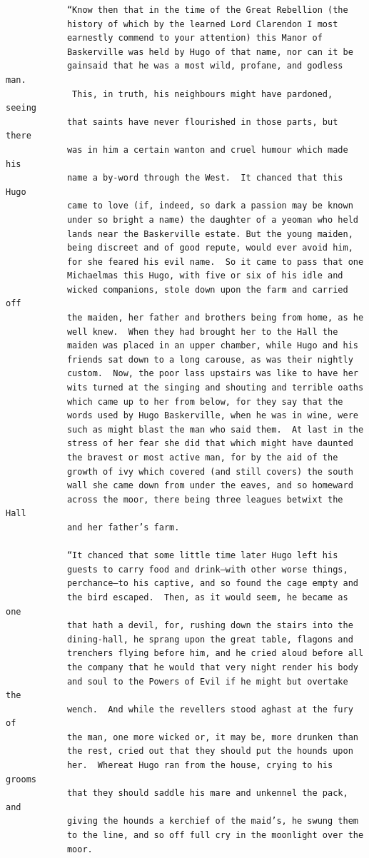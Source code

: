 \documentclass{article}
\begin{document}
\begin{verbatim}
            “Know then that in the time of the Great Rebellion (the
            history of which by the learned Lord Clarendon I most
            earnestly commend to your attention) this Manor of
            Baskerville was held by Hugo of that name, nor can it be
            gainsaid that he was a most wild, profane, and godless man.
             This, in truth, his neighbours might have pardoned, seeing
            that saints have never flourished in those parts, but there
            was in him a certain wanton and cruel humour which made his
            name a by-word through the West.  It chanced that this Hugo
            came to love (if, indeed, so dark a passion may be known
            under so bright a name) the daughter of a yeoman who held
            lands near the Baskerville estate. But the young maiden,
            being discreet and of good repute, would ever avoid him,
            for she feared his evil name.  So it came to pass that one
            Michaelmas this Hugo, with five or six of his idle and
            wicked companions, stole down upon the farm and carried off
            the maiden, her father and brothers being from home, as he
            well knew.  When they had brought her to the Hall the
            maiden was placed in an upper chamber, while Hugo and his
            friends sat down to a long carouse, as was their nightly
            custom.  Now, the poor lass upstairs was like to have her
            wits turned at the singing and shouting and terrible oaths
            which came up to her from below, for they say that the
            words used by Hugo Baskerville, when he was in wine, were
            such as might blast the man who said them.  At last in the
            stress of her fear she did that which might have daunted
            the bravest or most active man, for by the aid of the
            growth of ivy which covered (and still covers) the south
            wall she came down from under the eaves, and so homeward
            across the moor, there being three leagues betwixt the Hall
            and her father’s farm.

            “It chanced that some little time later Hugo left his
            guests to carry food and drink—with other worse things,
            perchance—to his captive, and so found the cage empty and
            the bird escaped.  Then, as it would seem, he became as one
            that hath a devil, for, rushing down the stairs into the
            dining-hall, he sprang upon the great table, flagons and
            trenchers flying before him, and he cried aloud before all
            the company that he would that very night render his body
            and soul to the Powers of Evil if he might but overtake the
            wench.  And while the revellers stood aghast at the fury of
            the man, one more wicked or, it may be, more drunken than
            the rest, cried out that they should put the hounds upon
            her.  Whereat Hugo ran from the house, crying to his grooms
            that they should saddle his mare and unkennel the pack, and
            giving the hounds a kerchief of the maid’s, he swung them
            to the line, and so off full cry in the moonlight over the
            moor.


\end{verbatim}
\end{document}
